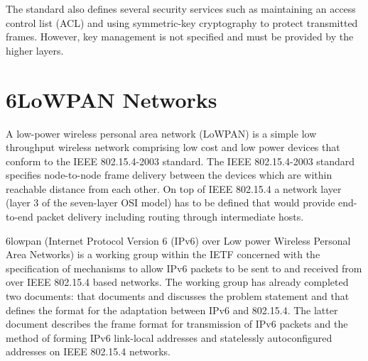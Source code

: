 \documentclass[12pt, titlepage, a4paper]{report}
\begin{document}
The standard also defines several security services such as maintaining an access control list (ACL) and
using symmetric-key cryptography to protect transmitted frames. However, key management is not specified and must be provided by the higher layers. 

\chapter{6LoWPAN Networks}\label{ch:6lowpan}
A low-power wireless personal area network (LoWPAN) is a simple low throughput wireless network comprising low cost and low power devices that conform to the IEEE 802.15.4-2003 standard. The IEEE 802.15.4-2003 standard specifies node-to-node frame delivery between the devices which are within reachable distance from each other. On top of IEEE 802.15.4 a network layer (layer 3 of the seven-layer OSI model) has to be defined that would provide end-to-end packet delivery including routing through intermediate hosts. 


6lowpan (Internet Protocol Version 6 (IPv6) over Low power Wireless Personal Area Networks) is a working group within the IETF concerned with the specification of mechanisms to allow IPv6 packets to be sent to and received from over IEEE 802.15.4 based networks. The working group has already completed two documents: \cite{rfc4919} that documents and discusses the problem statement and \cite{rfc4944} that defines the format for the adaptation between IPv6 and 802.15.4. The latter document describes the frame format for transmission of IPv6 packets and the method of forming IPv6 link-local addresses and statelessly autoconfigured addresses on IEEE 802.15.4 networks.

\end{document}

